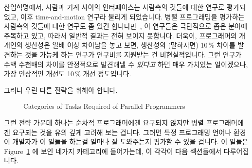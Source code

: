 \fi

산업혁명에서, 사람과 기계 사이의 인터페이스는 사람측의 것들에 대한 연구로
평가되었고, 이후 time-and-motion 연구라 불리게 되었습니다.
병렬 프로그래밍을 평가하는 사람측의 것들에 대한 연구도 좀 있긴 합니다만~\cite{
RyanEccles2005HPCSNovice,RyanEccles2006HPCSNoviceNeeds,
LorinHochstein2005SC,DuaneSzafron1994PEMPDS}, 이 연구들은 극단적으로
좁은 분야에 주목하고 있고, 따라서 일반적 결과는 전혀 보이지 못합니다.
더욱이, 프로그래머의 개개인의 생산성은 열배 이상 차이남을 놓고 보면, 생산성의
(말하자면) 10\,\% 차이를 발견하는 것을 가능케 하는 연구가 연구비를 지원받는 건
비현실적입니다.
그런 연구가 수백 수천배의 차이를 안정적으로 발견해낼 수 \emph{있다고} 하면 매우
가치있는 일이겠으나, 가장 인상적인 개선도 10\,\% 개선 정도입니다.

그러니 우린 다른 전략을 취해야 합니다.

\begin{figure}[tb]
\centering
{}
\caption{Categories of Tasks Required of Parallel Programmers}
\label{fig:intro:Categories of Tasks Required of Parallel Programmers}
\end{figure}

그런 전략 가운데 하나는 순차적 프로그래머에겐 요구되지 않지만 병렬
프로그래머에겐 요구되는 것을 유의 깊게 고려해 보는 겁니다.
그러면 특정 프로그래밍 언어나 환경이 개발자가 이 일들을 하는걸 얼마나 잘
도와주는지 평가할 수 있을 겁니다.
이 일들은
Figure~\ref{fig:intro:Categories of Tasks Required of Parallel Programmers}
에 보인 네가지 카테고리에 들어가는데, 이 각각이 다음 섹션들에서 다루어집니다.

